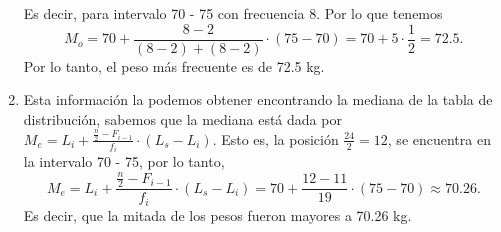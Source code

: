 \begin{solution}
\begin{enumerate}
        Es decir, para intervalo 70 - 75 con frecuencia 8.
        Por lo que tenemos
        \[
            M_o = 70 + \frac{8 - 2}{(8 - 2) + (8 - 2)}\cdot (75 - 70) = 70 + 5\cdot \frac{1}{2} = 72.5.
        \]
        Por lo tanto, el peso más frecuente es de 72.5 kg.
        \item Esta información la podemos obtener encontrando la mediana de la tabla de distribución, sabemos que la mediana está dada por $M_e = L_i + \frac{\frac{n}{2} - F_{i - 1}}{f_i}\cdot (L_s - L_i)$.
        Esto es, la posición $\frac{24}{2} = 12$, se encuentra en la intervalo 70 - 75, por lo tanto,
        \[
            M_e = L_i + \frac{\frac{n}{2} - F_{i - 1}}{f_i}\cdot (L_s - L_i) = 70 + \frac{12 - 11}{19}\cdot (75 - 70) \approx 70.26.
        \]
        Es decir, que la mitada de los pesos fueron mayores a 70.26 kg.\qedhere
    \end{enumerate}
\end{solution}

